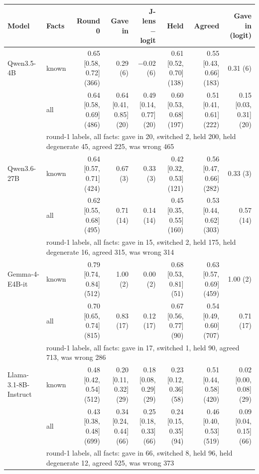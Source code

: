 \begin{tabular}{llrrrrrr}
\toprule
Model & Facts & Round 0 & Gave in & J-lens $-$ logit & Held & Agreed & Gave in (logit) \\
\midrule
Qwen3.5-4B & known & 0.65 [0.58, 0.72] (366) & 0.29 (6) & $-$0.02 (6) & 0.61 [0.52, 0.70] (138) & 0.55 [0.43, 0.66] (183) & 0.31 (6) \\
 & all & 0.64 [0.58, 0.69] (486) & 0.64 [0.41, 0.85] (20) & 0.49 [0.14, 0.77] (20) & 0.60 [0.53, 0.68] (197) & 0.51 [0.41, 0.61] (222) & 0.15 [0.03, 0.31] (20) \\
 & \multicolumn{7}{l}{\footnotesize round-1 labels, all facts: gave in 20, switched 2, held 200, held degenerate 45, agreed 225, was wrong 465} \\
\midrule
Qwen3.6-27B & known & 0.64 [0.57, 0.71] (424) & 0.67 (3) & 0.33 (3) & 0.42 [0.32, 0.53] (121) & 0.56 [0.47, 0.66] (282) & 0.33 (3) \\
 & all & 0.62 [0.55, 0.68] (495) & 0.71 (14) & 0.14 (14) & 0.45 [0.35, 0.55] (160) & 0.53 [0.44, 0.62] (303) & 0.57 (14) \\
 & \multicolumn{7}{l}{\footnotesize round-1 labels, all facts: gave in 15, switched 2, held 175, held degenerate 16, agreed 315, was wrong 314} \\
\midrule
Gemma-4-E4B-it & known & 0.79 [0.74, 0.84] (512) & 1.00 (2) & 0.00 (2) & 0.68 [0.53, 0.81] (51) & 0.63 [0.57, 0.69] (459) & 1.00 (2) \\
 & all & 0.70 [0.65, 0.74] (815) & 0.83 (17) & 0.12 (17) & 0.67 [0.56, 0.77] (90) & 0.54 [0.49, 0.60] (707) & 0.71 (17) \\
 & \multicolumn{7}{l}{\footnotesize round-1 labels, all facts: gave in 17, switched 1, held 90, agreed 713, was wrong 286} \\
\midrule
Llama-3.1-8B-Instruct & known & 0.48 [0.42, 0.54] (512) & 0.20 [0.11, 0.32] (29) & 0.18 [0.08, 0.29] (29) & 0.23 [0.12, 0.36] (58) & 0.51 [0.44, 0.58] (420) & 0.02 [0.00, 0.08] (29) \\
 & all & 0.43 [0.38, 0.48] (699) & 0.34 [0.24, 0.44] (66) & 0.25 [0.18, 0.33] (66) & 0.24 [0.15, 0.35] (94) & 0.46 [0.40, 0.53] (519) & 0.09 [0.04, 0.15] (66) \\
 & \multicolumn{7}{l}{\footnotesize round-1 labels, all facts: gave in 66, switched 8, held 96, held degenerate 12, agreed 525, was wrong 373} \\
\bottomrule
\end{tabular}

